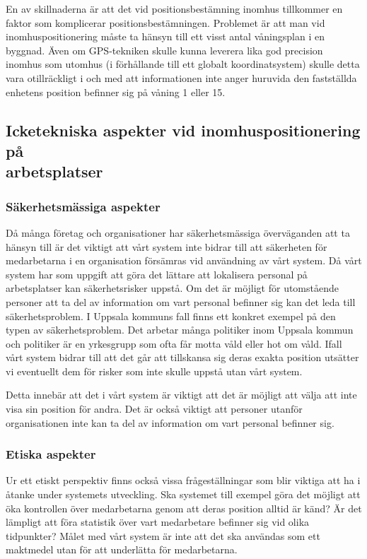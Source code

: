 \documentclass[swedish, a4paper,12pt]{article}
\begin{document}
En av skillnaderna är att det vid positionsbestämning inomhus tillkommer en faktor som komplicerar positionsbestämningen. Problemet är att man vid inomhuspositionering måste ta hänsyn till ett visst antal våningsplan i en byggnad. Även om GPS-tekniken skulle kunna leverera lika god precision inomhus som utomhus (i förhållande till ett globalt koordinatsystem) skulle detta vara otillräckligt i och med att informationen inte anger huruvida den fastställda enhetens position befinner sig på våning 1 eller 15.

\subsection{Icketekniska aspekter vid inomhuspositionering på \\arbetsplatser}

\subsubsection{Säkerhetsmässiga aspekter}
Då många företag och organisationer har säkerhetsmässiga överväganden att ta hänsyn till är det viktigt att vårt system inte bidrar till att säkerheten för medarbetarna i en organisation försämras vid användning av vårt system.
Då vårt system har som uppgift att göra det lättare att lokalisera personal på arbetsplatser kan säkerhetsrisker uppstå. Om det är möjligt för utomstående personer att ta del av information om vart personal befinner sig kan det leda till säkerhetsproblem. I Uppsala kommuns fall finns ett konkret exempel på den typen av säkerhetsproblem. Det arbetar många politiker inom Uppsala kommun och politiker är en yrkesgrupp som ofta får motta våld eller hot om våld. Ifall vårt system bidrar till att det går att tillskansa sig deras exakta position utsätter vi eventuellt dem för risker som inte skulle uppstå utan vårt system.

Detta innebär att det i vårt system är viktigt att det är möjligt att välja att inte visa sin position för andra. Det är också viktigt att personer utanför organisationen inte kan ta del av information om vart personal befinner sig.

\newpage
\subsubsection{Etiska aspekter}
Ur ett etiskt perspektiv finns också vissa frågeställningar som blir viktiga att ha i åtanke under systemets utveckling. Ska systemet till exempel göra det möjligt att öka kontrollen över medarbetarna genom att deras position alltid är känd? Är det lämpligt att föra statistik över vart medarbetare befinner sig vid olika tidpunkter?
Målet med vårt system är inte att det ska användas som ett maktmedel utan för att underlätta för medarbetarna.
\end{document}
